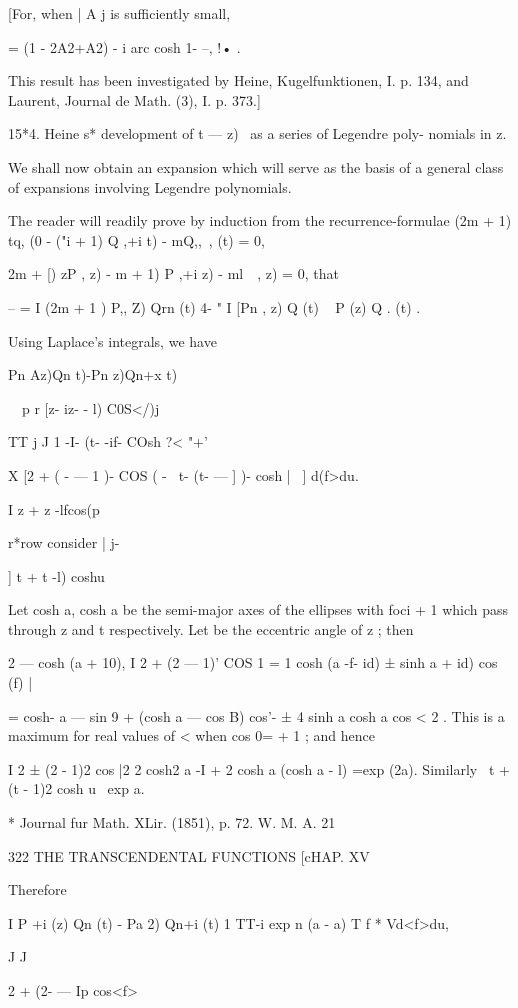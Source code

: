 {{{[For, when | A j is sufficiently small,

= (1 - 2A2+A2) - i arc cosh 1- --, !• .

This result has been investigated by Heine, Kugelfunktionen, I. p.
134, and Laurent, Journal de Math. (3), I. p. 373.]

15*4. Heine s* development of t — z)~ as a series of Legendre poly-
nomials in z.

We shall now obtain an expansion which will serve as the basis of a
general class of expansions involving Legendre polynomials.

The reader will readily prove by induction from the
recurrence-formulae (2m + 1) tq, (0 - ("i + 1) Q ,+i t) - mQ,,\ , (t)
= 0,

 2m + [) zP , z) - m + 1) P ,+i z) - ml\ \ , z) = 0, that

-- = I (2m + 1 ) P,, Z) Qrn (t) 4- " I [Pn , z) Q (t) ~ P (z) Q . (t)
.

Using Laplace's integrals, we have

Pn Az)Qn t)-Pn z)Qn+x t)

\ \ p r [z- iz- - l) C0S</)j

TT j J 1 -I- (t- -if- COsh ?< "+'

X [2 + ( - — 1 )- COS ( - \ t- (t- — ] )- cosh |~ ] d(f>du.

I z + z -lfcos(p

r*row consider | j-

] t + t -l) coshu

Let cosh a, cosh a be the semi-major axes of the ellipses with foci +
1 which pass through z and t respectively. Let be the eccentric angle
of z ; then

2 — cosh (a + 10), I 2 + (2 — 1)' COS 1 = 1 cosh (a -f- id) ± sinh a +
id) cos (f) |

= cosh- a — sin 9 + (cosh a — cos B) cos'- ± 4 sinh a cosh a cos < 2 .
This is a maximum for real values of < when cos 0= + 1 ; and hence

I 2 ± (2 - 1)2 cos |2 2 cosh2 a -I + 2 cosh a (cosh a - l) =exp (2a).
Similarly \ t + (t - 1)2 cosh u \ exp a.

* Journal fur Math. XLir. (1851), p. 72. W. M. A. 21

322 THE TRANSCENDENTAL FUNCTIONS [cHAP. XV

Therefore

I P +i (z) Qn (t) - Pa 2) Qn+i (t) 1 TT-i exp n (a - a) T f * Vd<f>du,

J J

2 + (2- — Ip cos<f>

}}}

